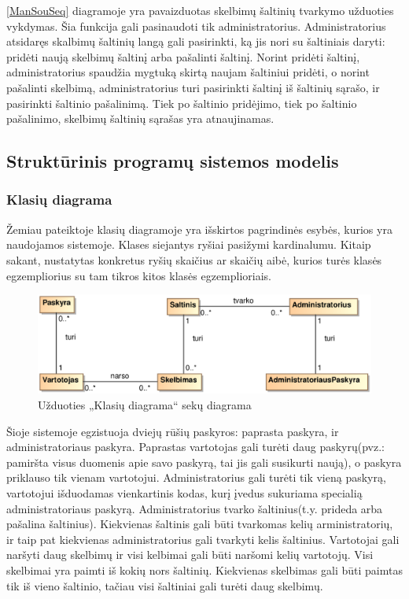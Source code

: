 \documentclass[12pt]{article}
\begin{document}
	\ref{ManSouSeq} diagramoje yra pavaizduotas skelbimų šaltinių tvarkymo užduoties vykdymas. Šia funkcija gali pasinaudoti tik administratorius. Administratorius atsidaręs skalbimų šaltinių langą gali pasirinkti, ką jis nori su šaltiniais daryti: pridėti naują skelbimų šaltinį arba pašalinti šaltinį. Norint pridėti šaltinį, administratorius spaudžia mygtuką skirtą naujam šaltiniui pridėti, o norint pašalinti skelbimą, administratorius turi pasirinkti šaltinį iš šaltinių sąrašo, ir pasirinkti šaltinio pašalinimą. Tiek po šaltinio pridėjimo, tiek po šaltinio pašalinimo, skelbimų šaltinių sąrašas yra atnaujinamas.
	\pagebreak
	
	\subsection{Struktūrinis programų sistemos modelis}
	\subsubsection{Klasių diagrama}
	
	Žemiau pateiktoje klasių diagramoje yra išskirtos pagrindinės esybės, kurios yra naudojamos sistemoje. Klases siejantys ryšiai pasižymi kardinalumu. Kitaip sakant, nustatytas konkretus ryšių skaičius ar skaičių aibė, kurios turės klasės egzempliorius su tam tikros kitos klasės egzemplioriais.
	
	\begin{figure}[h]
		\begin{center}
			\includegraphics[width=\textwidth]{KlasiuDiagrama.eps}
			\caption{Užduoties „Klasių diagrama“ sekų diagrama\label{ClassDiagram}}
		\end{center}
	\end{figure}
	
	Šioje sistemoje egzistuoja dviejų rūšių paskyros: paprasta paskyra, ir administratoriaus paskyra. Paprastas vartotojas gali turėti daug paskyrų(pvz.: pamiršta visus duomenis apie savo paskyrą, tai jis gali susikurti naują), o paskyra priklauso tik vienam vartotojui. Administratorius gali turėti tik vieną paskyrą, vartotojui išduodamas vienkartinis kodas, kurį įvedus sukuriama specialią administratoriaus paskyrą. Administratorius tvarko šaltinius(t.y. prideda arba pašalina šaltinius). Kiekvienas šaltinis gali būti tvarkomas kelių arministratorių, ir taip pat kiekvienas administratorius gali tvarkyti kelis šaltinius. Vartotojai gali naršyti daug skelbimų ir visi kelbimai gali būti naršomi kelių vartotojų. Visi skelbimai yra paimti iš kokių nors šaltinių. Kiekvienas skelbimas gali būti paimtas tik iš vieno šaltinio, tačiau visi šaltiniai gali turėti daug skelbimų.
	\pagebreak
	
\end{document}
